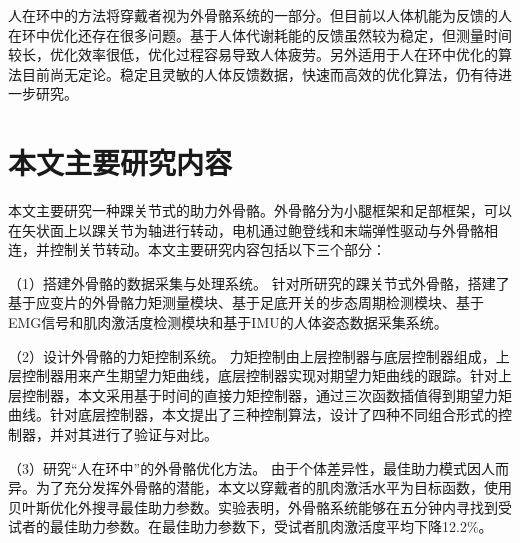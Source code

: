 人在环中的方法将穿戴者视为外骨骼系统的一部分。但目前以人体机能为反馈的人在环中优化还存在很多问题。基于人体代谢耗能的反馈虽然较为稳定，但测量时间较长，优化效率很低，优化过程容易导致人体疲劳。另外适用于人在环中优化的算法目前尚无定论。稳定且灵敏的人体反馈数据，快速而高效的优化算法，仍有待进一步研究。

\section{本文主要研究内容}

本文主要研究一种踝关节式的助力外骨骼\cite{p42}。外骨骼分为小腿框架和足部框架，可以在矢状面上以踝关节为轴进行转动，电机通过鲍登线和末端弹性驱动与外骨骼相连，并控制关节转动。本文主要研究内容包括以下三个部分：

（1）搭建外骨骼的数据采集与处理系统。
针对所研究的踝关节式外骨骼，搭建了基于应变片的外骨骼力矩测量模块、基于足底开关的步态周期检测模块、基于EMG信号和肌肉激活度检测模块和基于IMU的人体姿态数据采集系统。

（2）设计外骨骼的力矩控制系统。
力矩控制由上层控制器与底层控制器组成，上层控制器用来产生期望力矩曲线，底层控制器实现对期望力矩曲线的跟踪。针对上层控制器，本文采用基于时间的直接力矩控制器，通过三次函数插值得到期望力矩曲线。针对底层控制器，本文提出了三种控制算法，设计了四种不同组合形式的控制器，并对其进行了验证与对比。

（3）研究“人在环中”的外骨骼优化方法。
由于个体差异性，最佳助力模式因人而异。为了充分发挥外骨骼的潜能，本文以穿戴者的肌肉激活水平为目标函数，使用贝叶斯优化外搜寻最佳助力参数。实验表明，外骨骼系统能够在五分钟内寻找到受试者的最佳助力参数。在最佳助力参数下，受试者肌肉激活度平均下降12.2\%。